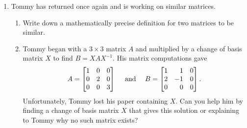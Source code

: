 \begin{enumerate}
	\item Tommy has returned once again and is working on similar matrices.
	\begin{enumerate}
		\item Write down a mathematically precise definition for two matrices to be similar.

\item
Tommy began with a $3\times 3$ matrix $A$ and multiplied by a change of basis matrix $X$ to find $B=XAX^{-1}$. His matrix computations gave
			\[A=\mat{
1 & 0 & 0  \\
0 & 2 & 0 \\
0 & 0 & 3
}\quad \text{ and } \quad
			B=\mat{
1 & 1 & 0  \\
2 & -1 & 0 \\
0 & 0 & 0
}.
\]
	Unfortunately, Tommy lost his paper containing $X$.
			Can you help him by finding a change of basis matrix
			$X$ that gives this solution or explaining to Tommy why no such matrix exists?
		\end{enumerate}
\end{enumerate} 